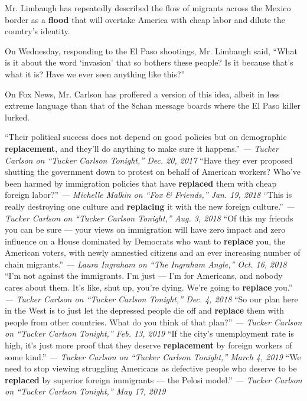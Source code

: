 Mr. Limbaugh has repeatedly described the flow of migrants across the
Mexico border as a \textbf{flood} that will overtake America with cheap
labor and dilute the country's identity.

On Wednesday, responding to the El Paso shootings, Mr. Limbaugh said,
``What is it about the word `invasion' that so bothers these people? Is
it because that's what it is? Have we ever seen anything like this?''

On Fox News, Mr. Carlson has proffered a version of this idea, albeit in
less extreme language than that of the 8chan message boards where the El
Paso killer lurked.

 ``Their political success does not depend on good policies but on
demographic \textbf{replacement}, and they'll do anything to make sure
it happens.'' \emph{--- Tucker Carlson on ``Tucker Carlson Tonight,''
Dec. 20, 2017} ``Have they ever proposed shutting the government down to
protest on behalf of American workers? Who've been harmed by immigration
policies that have \textbf{replaced} them with cheap foreign labor?''
\emph{--- Michelle Malkin on ``Fox \& Friends,'' Jan. 19, 2018} ``This
is really destroying one culture and \textbf{replacing} it with the new
foreign culture.'' \emph{--- Tucker Carlson on ``Tucker Carlson
Tonight,'' Aug. 3, 2018} ``Of this my friends you can be sure --- your
views on immigration will have zero impact and zero influence on a House
dominated by Democrats who want to \textbf{replace} you, the American
voters, with newly amnestied citizens and an ever increasing number of
chain migrants.'' \emph{--- Laura Ingraham on ``The Ingraham Angle,''
Oct. 16, 2018} ``I'm not against the immigrants. I'm just --- I'm for
Americans, and nobody cares about them. It's like, shut up, you're
dying. We're going to \textbf{replace} you.'' \emph{--- Tucker Carlson
on ``Tucker Carlson Tonight,'' Dec. 4, 2018} ``So our plan here in the
West is to just let the depressed people die off and \textbf{replace}
them with people from other countries. What do you think of that plan?''
\emph{--- Tucker Carlson on ``Tucker Carlson Tonight,'' Feb. 13, 2019}
``If the city's unemployment rate is high, it's just more proof that
they deserve \textbf{replacement} by foreign workers of some kind.''
\emph{--- Tucker Carlson on ``Tucker Carlson Tonight,'' March 4, 2019}
``We need to stop viewing struggling Americans as defective people who
deserve to be \textbf{replaced} by superior foreign immigrants --- the
Pelosi model.'' \emph{--- Tucker Carlson on ``Tucker Carlson Tonight,''
May 17, 2019}

